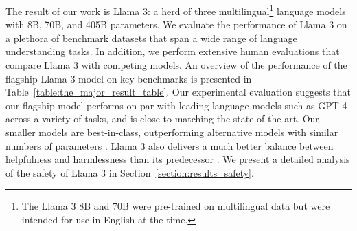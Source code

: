 \documentclass[dvipsnames]{fairmeta}
\begin{document}
The result of our work is Llama 3: a herd of three multilingual\footnote{The Llama 3 8B and 70B were pre-trained on multilingual data but were intended for use in English at the time.} language models with 8B, 70B, and 405B parameters.
We evaluate the performance of Llama 3 on a plethora of benchmark datasets that span a wide range of language understanding tasks. 
In addition, we perform extensive human evaluations that compare Llama 3 with competing models. 
An overview of the performance of the flagship Llama 3 model on key benchmarks is presented in Table~\ref{table:the_major_result_table}.
Our experimental evaluation suggests that our flagship model performs on par with leading language models such as GPT-4 \citep{openai2023gpt4} across a variety of tasks, and is close to matching the state-of-the-art. 
Our smaller models are best-in-class, outperforming alternative models with similar numbers of parameters \citep{bai2023qwen,jiang2023mistral}. 
Llama 3 also delivers a much better balance between helpfulness and harmlessness than its predecessor \citep{touvron2023llama2}.
We present a detailed analysis of the safety of Llama 3 in Section~\ref{section:results_safety}.

\end{document}
